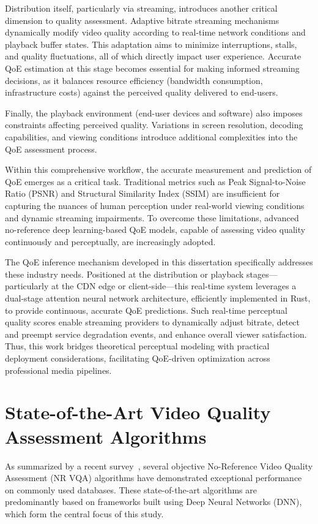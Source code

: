 Distribution itself, particularly via streaming, introduces another critical dimension to quality assessment. Adaptive bitrate streaming mechanisms dynamically modify video quality according to real-time network conditions and playback buffer states. This adaptation aims to minimize interruptions, stalls, and quality fluctuations, all of which directly impact user experience. Accurate QoE estimation at this stage becomes essential for making informed streaming decisions, as it balances resource efficiency (bandwidth consumption, infrastructure costs) against the perceived quality delivered to end-users.

Finally, the playback environment (end-user devices and software) also imposes constraints affecting perceived quality. Variations in screen resolution, decoding capabilities, and viewing conditions introduce additional complexities into the QoE assessment process.

Within this comprehensive workflow, the accurate measurement and prediction of QoE emerges as a critical task. Traditional metrics such as Peak Signal-to-Noise Ratio (PSNR) and Structural Similarity Index (SSIM) are insufficient for capturing the nuances of human perception under real-world viewing conditions and dynamic streaming impairments. To overcome these limitations, advanced no-reference deep learning-based QoE models, capable of assessing video quality continuously and perceptually, are increasingly adopted.

The QoE inference mechanism developed in this dissertation specifically addresses these industry needs. Positioned at the distribution or playback stages—particularly at the CDN edge or client-side—this real-time system leverages a dual-stage attention neural network architecture, efficiently implemented in Rust, to provide continuous, accurate QoE predictions. Such real-time perceptual quality scores enable streaming providers to dynamically adjust bitrate, detect and preempt service degradation events, and enhance overall viewer satisfaction. Thus, this work bridges theoretical perceptual modeling with practical deployment considerations, facilitating QoE-driven optimization across professional media pipelines.

\section{State-of-the-Art Video Quality Assessment Algorithms}\label{sec:se21}

As summarized by a recent survey~\cite{min2024perceptual}, several objective No-Reference Video Quality Assessment (NR VQA) algorithms have demonstrated exceptional performance on commonly used databases. These state-of-the-art algorithms are predominantly based on frameworks built using Deep Neural Networks (DNN), which form the central focus of this study. 

